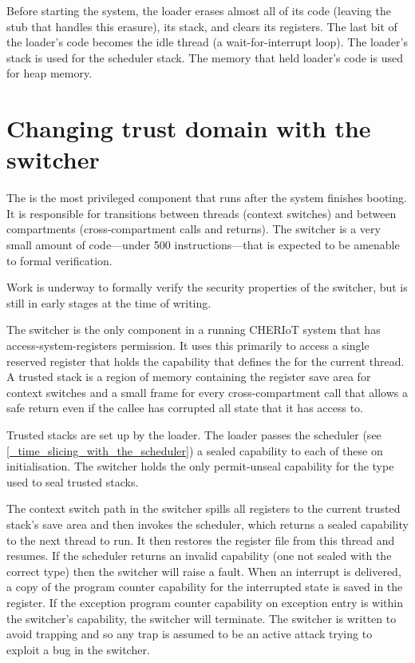 Before starting the system, the loader erases almost all of its code (leaving the stub that handles this erasure), its stack, and clears its registers.
The last bit of the loader's code becomes the idle thread (a wait-for-interrupt loop).
The loader's stack is used for the scheduler stack.
The memory that held loader's code is used for heap memory.

\section{Changing trust domain with the switcher}

The  is the most privileged component that runs after the system finishes booting.
It is responsible for transitions between threads (context switches) and between compartments (cross-compartment calls and returns).
The switcher is a very small amount of code—under 500 instructions—that is expected to be amenable to formal verification.

\begin{note}
Work is underway to formally verify the security properties of the switcher, but is still in early stages at the time of writing.
\end{note}

The switcher is the only component in a running CHERIoT system that has access-system-registers permission.
It uses this primarily to access a single reserved register that holds the capability that defines the  for the current thread.
A trusted stack is a region of memory containing the register save area for context switches and a small frame for every cross-compartment call that allows a safe return even if the callee has corrupted all state that it has access to.

Trusted stacks are set up by the loader.
The loader passes the scheduler (see \ref{_time_slicing_with_the_scheduler}) a sealed capability to each of these on initialisation.
The switcher holds the only permit-unseal capability for the type used to seal trusted stacks.

The context switch path in the switcher spills all registers to the current trusted stack's save area and then invokes the scheduler, which returns a sealed capability to the next thread to run.
It then restores the register file from this thread and resumes.
If the scheduler returns an invalid capability (one not sealed with the correct type) then the switcher will raise a fault.
When an interrupt is delivered, a copy of the program counter capability for the interrupted state is saved in the  register.
If the exception program counter capability on exception entry is within the switcher's capability, the switcher will terminate.
The switcher is written to avoid trapping and so any trap is assumed to be an active attack trying to exploit a bug in the switcher.

